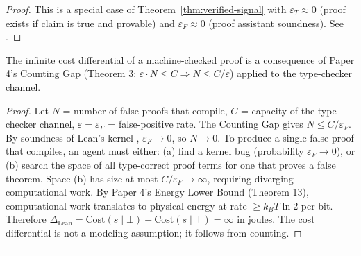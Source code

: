 \begin{proof}
This is a special case of Theorem~\ref{thm:verified-signal} with
$\varepsilon_T \approx 0$ (proof exists if claim is true and provable) and
$\varepsilon_F \approx 0$ (proof assistant soundness). See \cite{demoura2021lean4,debruijn1970automath}.
\end{proof}

\begin{corollary}[Counting Gap grounds $\Delta_{\text{Lean}} = \infty$]\label{cor:counting-gap-lean}
The infinite cost differential of a machine-checked proof is a consequence of Paper 4's
Counting Gap (Theorem 3: $\varepsilon \cdot N \leq C \Rightarrow N \leq C/\varepsilon$)
applied to the type-checker channel.
\end{corollary}

\begin{proof}
Let $N$ = number of false proofs that compile, $C$ = capacity of the type-checker channel,
$\varepsilon = \varepsilon_F$ = false-positive rate. The Counting Gap gives $N \leq C / \varepsilon_F$.
By soundness of Lean's kernel \cite{demoura2021lean4}, $\varepsilon_F \to 0$, so $N \to 0$.
To produce a single false proof that compiles, an agent must either:
(a) find a kernel bug (probability $\varepsilon_F \to 0$), or
(b) search the space of all type-correct proof terms for one that proves a false theorem.
Space (b) has size at most $C / \varepsilon_F \to \infty$, requiring diverging computational work.
By Paper 4's Energy Lower Bound (Theorem 13), computational work translates to physical energy at rate
$\geq k_B T \ln 2$ per bit. Therefore $\Delta_{\text{Lean}} = \text{Cost}(s \mid \bot) - \text{Cost}(s \mid \top) = \infty$
in joules. The cost differential is not a modeling assumption; it follows from counting.
\end{proof}

\begin{center}\rule{0.5\linewidth}{0.5pt}\end{center}
